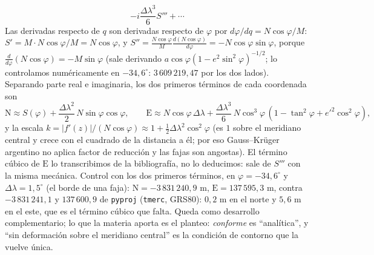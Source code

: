 \begin{enumerate}[label=(\alph*)]
\[    -i\frac{\Delta\lambda^3}6S'''+\cdots
  \]
  Las derivadas respecto de \(q\) son derivadas respecto de \(\varphi\) por
  \(d\varphi/dq=N\cos\varphi/M\): \(S'=M\cdot N\cos\varphi/M=N\cos\varphi\), y
  \(S''=\frac{N\cos\varphi}{M}\frac{d(N\cos\varphi)}{d\varphi}=-N\cos\varphi\sin\varphi\),
  porque \(\frac{d}{d\varphi}(N\cos\varphi)=-M\sin\varphi\) (sale derivando
  \(a\cos\varphi(1-e^2\sin^2\varphi)^{-1/2}\); lo controlamos numéricamente en
  \(-34{,}6^\circ\): \(3\,609\,219{,}47\) por los dos lados). Separando parte real e
  imaginaria, los dos primeros términos de cada coordenada son
  \[
    \mathrm N\approx S(\varphi)+\frac{\Delta\lambda^2}2\,N\sin\varphi\cos\varphi,\qquad
    \mathrm E\approx N\cos\varphi\,\Delta\lambda
    +\frac{\Delta\lambda^3}{6}\,N\cos^3\varphi\,(1-\tan^2\varphi+e'^2\cos^2\varphi),
  \]
  y la escala \(k=|f'(z)|/(N\cos\varphi)\approx1+\tfrac12\Delta\lambda^2\cos^2\varphi\)
  (es \(1\) sobre el meridiano central y crece con el cuadrado de la distancia a él; por
  eso Gauss--Krüger argentino no aplica factor de reducción y las fajas son angostas). El
  término cúbico de \(\mathrm E\) lo transcribimos de la bibliografía, no lo deducimos:
  sale de \(S'''\) con la misma mecánica. Control con los dos primeros términos, en
  \(\varphi=-34{,}6^\circ\) y \(\Delta\lambda=1{,}5^\circ\) (el borde de una faja):
  \(\mathrm N=-3\,831\,240{,}9\) m, \(\mathrm E=137\,595{,}3\) m, contra
  \(-3\,831\,241{,}1\) y \(137\,600{,}9\) de \texttt{pyproj} (\texttt{tmerc}, GRS80):
  \(0{,}2\) m en el norte y \(5{,}6\) m en el este, que es el término cúbico que falta.
  Queda como desarrollo complementario; lo que la materia aporta es el planteo:
  \emph{conforme} es \enquote{analítica}, y \enquote{sin deformación sobre el meridiano central} es la
  condición de contorno que la vuelve única.
\end{enumerate}

